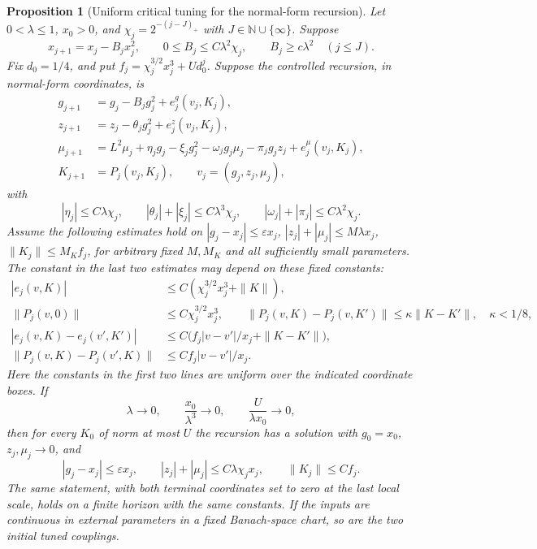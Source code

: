 \documentclass[11pt]{article}
\newtheorem{proposition}{Proposition}[section]
\begin{document}
\begin{proposition}[Uniform critical tuning for the normal-form recursion]\label{prop:scaled_flow}
Let \(0<\lambda\le1\), \(x_0>0\), and \(\chi_j=2^{-(j-J)_+}\) with
\(J\in\mathbb N\cup\{\infty\}\). Suppose
\[
 x_{j+1}=x_j-B_jx_j^2,\qquad
 0\le B_j\le C\lambda^2\chi_j,\qquad
 B_j\ge c\lambda^2\quad(j\le J).
\]
Fix \(d_0=1/4\), and put
\(f_j=\chi_j^{3/2}x_j^3+U d_0^j\).
Suppose the controlled recursion, in normal-form coordinates, is
\begin{align*}
 g_{j+1}&=g_j-B_jg_j^2+e_j^g(v_j,K_j),\\
 z_{j+1}&=z_j-\theta_jg_j^2+e_j^z(v_j,K_j),\\
 \mu_{j+1}&=L^2\mu_j+\eta_jg_j-\xi_jg_j^2
       -\omega_jg_j\mu_j-\pi_jg_jz_j+e_j^\mu(v_j,K_j),\\
 K_{j+1}&=P_j(v_j,K_j),\qquad v_j=(g_j,z_j,\mu_j),
\end{align*}
with
\[
 |\eta_j|\le C\lambda\chi_j,\qquad
 |\theta_j|+|\xi_j|\le C\lambda^3\chi_j,\qquad
 |\omega_j|+|\pi_j|\le C\lambda^2\chi_j.
\]
Assume the following estimates hold on
\(|g_j-x_j|\le\varepsilon x_j\),
\(|z_j|+|\mu_j|\le M\lambda x_j\),
\(\|K_j\|\le M_K f_j\), for arbitrary fixed \(M,M_K\) and all
sufficiently small parameters. The constant in the last two estimates
may depend on these fixed constants:
\begin{align*}
 |e_j(v,K)|&\le C(\chi_j^{3/2}x_j^3+\|K\|),\\
 \|P_j(v,0)\|&\le C\chi_j^{3/2}x_j^3,\qquad
 \|P_j(v,K)-P_j(v,K')\|\le\kappa\|K-K'\|,\quad\kappa<1/8,\\
 |e_j(v,K)-e_j(v',K')|&\le C\big(f_j|v-v'|/x_j+\|K-K'\|\big),\\
 \|P_j(v,K)-P_j(v',K)\|&\le C f_j|v-v'|/x_j .
\end{align*}
Here the constants in the first two lines are uniform over the
indicated coordinate boxes. If
\[
 \lambda\longrightarrow0,\qquad
 \frac{x_0}{\lambda^3}\longrightarrow0,\qquad
 \frac{U}{\lambda x_0}\longrightarrow0,
\]
then for every \(K_0\) of norm at most \(U\) the recursion has a
solution with \(g_0=x_0\), \(z_j,\mu_j\to0\), and
\[
 |g_j-x_j|\le\varepsilon x_j,\qquad
 |z_j|+|\mu_j|\le C\lambda\chi_j x_j,\qquad
 \|K_j\|\le C f_j.
\]
The same statement, with both terminal coordinates set to zero at the
last local scale, holds on a finite horizon with the same constants.
If the inputs are continuous in external parameters in a fixed
Banach-space chart, so are the two initial tuned couplings.
\end{proposition}
\end{document}
